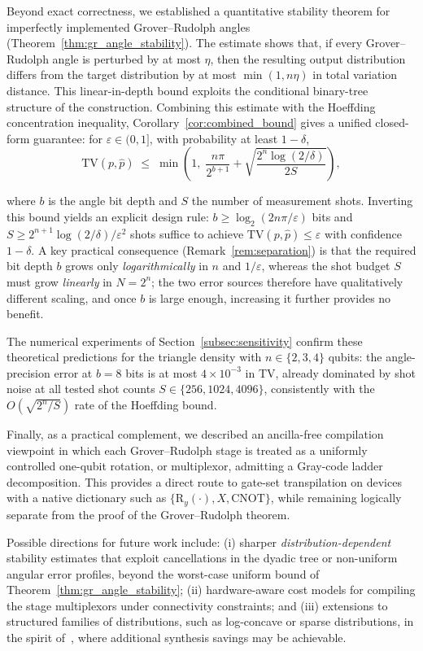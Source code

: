 \documentclass{article}
\newcommand{\RY}{\mathrm{R}_y}
\newcommand{\CNOT}{\mathrm{CNOT}}
\numberwithin{equation}{section}
\begin{document}
Beyond exact correctness, we established a quantitative stability theorem for imperfectly implemented
Grover--Rudolph angles (Theorem~\ref{thm:gr_angle_stability}).
The estimate shows that, if every Grover--Rudolph angle is perturbed by at most
\(\eta\), then the resulting output distribution differs from the target distribution by at most \(\min(1,n\eta)\)
in total variation distance. This linear-in-depth bound exploits the conditional binary-tree structure of
the construction. Combining this estimate with the Hoeffding concentration inequality,
Corollary~\ref{cor:combined_bound} gives a unified closed-form guarantee: for $\varepsilon\in(0,1]$, with probability at least
$1-\delta$,
\[
\mathrm{TV}(p,\hat p)\;\le\;\min\!\left(1,\;\frac{n\pi}{2^{b+1}}+\sqrt{\frac{2^n\log(2/\delta)}{2S}}\right),
\]
{ where $b$ is the angle bit depth and $S$ the number of measurement shots.
Inverting this bound yields an explicit design rule: $b\ge\log_2(2n\pi/\varepsilon)$ bits and
$S\ge 2^{n+1}\log(2/\delta)/\varepsilon^2$ shots suffice to achieve $\mathrm{TV}(p,\hat p)\le\varepsilon$
with confidence $1-\delta$. A key practical consequence (Remark~\ref{rem:separation}) is that the
required bit depth $b$ grows only \emph{logarithmically} in $n$ and $1/\varepsilon$, whereas the shot
budget $S$ must grow \emph{linearly} in $N=2^n$; the two error sources therefore have qualitatively
different scaling, and once $b$ is large enough, increasing it further provides no benefit.

The numerical experiments of Section~\ref{subsec:sensitivity} confirm these theoretical predictions
for the triangle density with $n\in\{2,3,4\}$ qubits: the angle-precision error at $b=8$ bits
is at most $4\times10^{-3}$ in TV, already dominated by shot noise at all tested shot counts
$S\in\{256,1024,4096\}$, consistently with the $O(\sqrt{2^n/S})$ rate of the Hoeffding bound.}

Finally, as a practical complement, we described an ancilla-free compilation viewpoint in which each
Grover--Rudolph stage is treated as a uniformly controlled one-qubit rotation, or multiplexor, admitting a
Gray-code ladder decomposition. This provides a direct route to gate-set transpilation on devices with a
native dictionary such as \(\{\RY(\cdot),X,\CNOT\}\), while remaining logically separate from the proof of the
Grover--Rudolph theorem.

Possible directions for future work include: (i) sharper \emph{distribution-dependent} stability
estimates that exploit cancellations in the dyadic tree or non-uniform angular error profiles,
beyond the worst-case uniform bound of Theorem~\ref{thm:gr_angle_stability};
(ii) hardware-aware cost models for compiling the stage multiplexors under connectivity constraints;
and (iii) extensions to structured families of distributions, such as log-concave or sparse
distributions, in the spirit of~\cite{Ramacciotti2024}, where additional synthesis savings
may be achievable.
\end{document}
